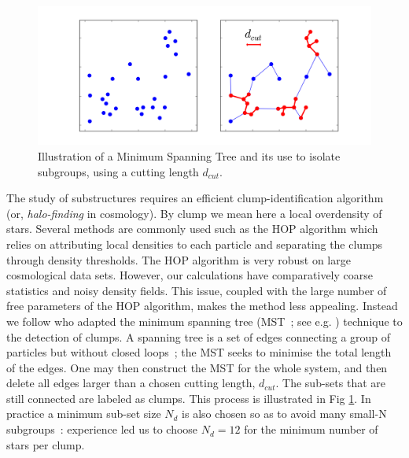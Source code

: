 \begin{figure}
\begin{center}
\includegraphics[width=0.8\columnwidth]{Figures/1_MST.png}
\end{center}
\caption{Illustration of a Minimum Spanning Tree and its use to isolate subgroups, using a cutting length $d_{cut}$.}
\label{Fig:1_MST}
\end{figure}

The study of substructures requires an efficient clump-identification algorithm (or, {\it halo-finding} in cosmology). By clump we mean here a local overdensity of stars. Several methods are commonly used such as the HOP algorithm \citep{Eisenstein1998,Skory2010} which relies on attributing local densities to each particle and separating the clumps through density thresholds. The HOP algorithm is very robust on large cosmological data sets. However, our calculations have comparatively coarse statistics and noisy density fields. This issue, coupled with the  large number of free parameters of the HOP algorithm, makes the method less appealing. Instead we follow \cite{Maschberger2010} who adapted the minimum spanning tree (MST~; see e.g. \citealt{Allison2009b,Olczak2011}) technique to the detection of clumps. A spanning tree is a set of edges connecting a group of  particles but without closed loops~; the MST seeks to minimise the total length of the edges. One may then construct the MST for the whole system, and then delete all edges larger than a chosen cutting length, $d_{cut}$. The sub-sets that are still connected  are labeled as clumps. This process is illustrated in Fig \ref{Fig:1_MST}. In practice a minimum sub-set size $N_d$  is also chosen so as to avoid many small-N subgroups~: experience led us to choose  $N_d = 12$ for the minimum number of stars per clump. 





